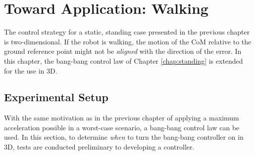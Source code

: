 %
\chapter{Toward Application: Walking}\label{chap:walking}
The control strategy for a static, standing case presented in the previous chapter is two-dimensional. If the robot is walking, the motion of the \ac{CoM} relative to the ground reference point might not be \textit{aligned} with the direction of the error. In this chapter, the bang-bang control law of Chapter \ref{chap:standing} is extended for the use in \ac{3D}.
\section{Experimental Setup}
With the same motivation as in the previous chapter of applying a maximum acceleration possible in a worst-case scenario, a bang-bang control law can be used. In this section, to determine \textit{when} to turn the bang-bang controller on in \ac{3D},  tests are conducted preliminary to developing a controller. 


